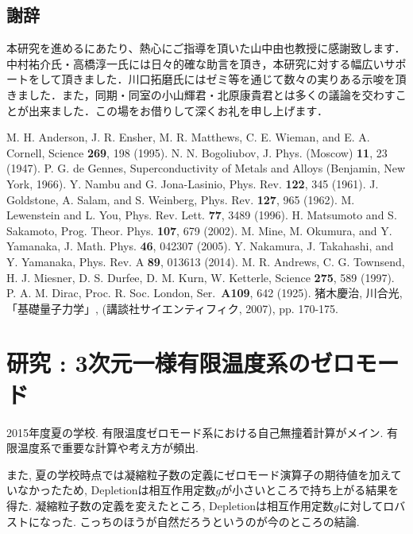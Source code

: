 \documentclass[10.5pt,a4paper]{jreport}
\begin{document}
\section*{謝辞}
本研究を進めるにあたり、熱心にご指導を頂いた山中由也教授に感謝致します．中村祐介氏・高橋淳一氏には日々的確な助言を頂き，本研究に対する幅広いサポートをして頂きました．川口拓磨氏にはゼミ等を通じて数々の実りある示唆を頂きました．また，同期・同室の小山輝君・北原康貴君とは多くの議論を交わすことが出来ました．この場をお借りして深くお礼を申し上げます．
\begin{thebibliography}{99}
 M. H. Anderson, J. R. Ensher, M. R. Matthews, C. E. Wieman, and E. A. Cornell, Science
  {\bf 269}, 198 (1995).
 N. N. Bogoliubov, J. Phys. (Moscow) {\bf 11}, 23 (1947).
 P. G. de Gennes, Superconductivity of Metals and Alloys (Benjamin, New York, 1966).
 Y. Nambu and G. Jona-Lasinio, Phys. Rev. {\bf 122}, 345 (1961).
 J. Goldstone, A. Salam, and S. Weinberg, Phys. Rev. {\bf 127}, 965 (1962).
M. Lewenstein and L. You, Phys. Rev. Lett. {\bf 77}, 3489 (1996).
H. Matsumoto and S. Sakamoto, Prog. Theor. Phys. {\bf 107}, 679 (2002).
M. Mine, M. Okumura, and Y. Yamanaka, J. Math. Phys. {\bf 46}, 042307 (2005).
 Y. Nakamura, J. Takahashi, and Y. Yamanaka, Phys. Rev. A {\bf 89}, 013613 (2014).
 M. R. Andrews, C. G. Townsend, H. J. Miesner, D. S. Durfee, D. M. Kurn, W. Ketterle, Science {\bf 275}, 589 (1997).
 P. A. M. Dirac, Proc. R. Soc. London, Ser.\ {\bf A109}, 642 (1925).
 猪木慶治, 川合光, 「基礎量子力学」, (講談社サイエンティフィク, 2007), pp. 170-175.
\end{thebibliography}


\newpage
\chapter{研究 : 3次元一様有限温度系のゼロモード}
2015年度夏の学校. 有限温度ゼロモード系における自己無撞着計算がメイン. 有限温度系で重要な計算や考え方が頻出.

また, 夏の学校時点では凝縮粒子数の定義にゼロモード演算子の期待値を加えていなかったため, Depletionは相互作用定数$g$が小さいところで持ち上がる結果を得た. 凝縮粒子数の定義を変えたところ, Depletionは相互作用定数$g$に対してロバストになった. こっちのほうが自然だろうというのが今のところの結論. 
\end{document}
